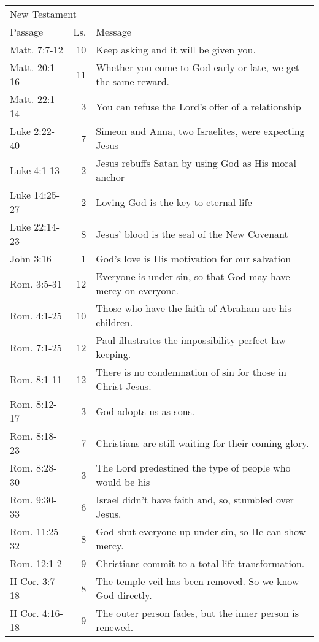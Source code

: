 \begin{table}[ht]%
\centering
\begin{tabular}{lrp{11cm}}
\toprule
\multicolumn{3}{l}{New Testament}\\
Passage & Ls. & Message \\
\midrule
Matt. 7:7-12    & 10 & Keep asking and it will be given you.\\
Matt. 20:1-16   & 11 & Whether you come to God early or late, we get the same reward.\\
Matt. 22:1-14   & 3  & You can refuse the Lord's offer of a relationship\\
Luke 2:22-40    & 7  & Simeon and Anna, two Israelites, were expecting Jesus\\
Luke 4:1-13     & 2  & Jesus rebuffs Satan by using God as His moral anchor\\
Luke 14:25-27   & 2  & Loving God is the key to eternal life\\
Luke 22:14-23   & 8  & Jesus' blood is the seal of the New Covenant\\
John 3:16       & 1  & God's love is His motivation for our salvation\\
Rom. 3:5-31     & 12 & Everyone is under sin, so that God may have mercy on everyone.\\
Rom. 4:1-25     & 10 & Those who have the faith of Abraham are his children.\\
Rom. 7:1-25     & 12 & Paul illustrates the impossibility perfect law keeping.\\
Rom. 8:1-11     & 12 & There is no condemnation of sin for those in Christ Jesus.\\
Rom. 8:12-17    & 3  & God adopts us as sons.\\
Rom. 8:18-23    & 7  & Christians are still waiting for their coming glory.\\
Rom. 8:28-30    & 3  & The Lord predestined the type of people who would be his\\
Rom. 9:30-33    & 6  & Israel didn't have faith and, so, stumbled over Jesus.\\
Rom. 11:25-32   & 8  & God shut everyone up under sin, so He can show mercy.\\
Rom. 12:1-2     & 9  & Christians commit to a total life transformation.\\
II Cor. 3:7-18  & 8  & The temple veil has been removed.  So we know God directly.\\
II Cor. 4:16-18 & 9  & The outer person fades, but the inner person is renewed.\\

\end{tabular}
\end{table}
